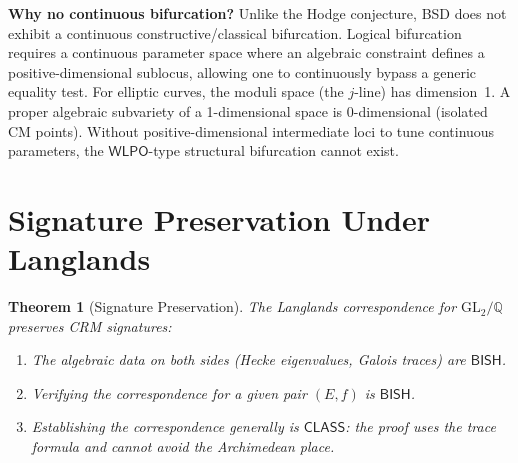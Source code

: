 \documentclass[11pt,a4paper]{article}
\theoremstyle{plain}
\newtheorem{theorem}{Theorem}[section]
\theoremstyle{definition}
\newcommand{\BISH}{\textsf{BISH}}
\newcommand{\WLPO}{\textsf{WLPO}}
\newcommand{\CLASS}{\textsf{CLASS}}
\newcommand{\Q}{\mathbb{Q}}
\newcommand{\GL}{\mathrm{GL}}
\begin{document}
\textbf{Why no continuous bifurcation?} Unlike the Hodge conjecture, BSD does not exhibit a continuous constructive/classical bifurcation. Logical bifurcation requires a continuous parameter space where an algebraic constraint defines a positive-dimensional sublocus, allowing one to continuously bypass a generic equality test. For elliptic curves, the moduli space (the $j$-line) has dimension~1. A proper algebraic subvariety of a 1-dimensional space is 0-dimensional (isolated CM points). Without positive-dimensional intermediate loci to tune continuous parameters, the $\WLPO$-type structural bifurcation cannot exist.


\section{Signature Preservation Under Langlands}\label{sec:langlands}

\begin{theorem}[Signature Preservation]\label{thm:sig-preserve}
The Langlands correspondence for $\GL_2/\Q$ preserves CRM signatures:
\begin{enumerate}[label=(\roman*)]
\item The algebraic data on both sides (Hecke eigenvalues, Galois traces) are $\BISH$.
\item Verifying the correspondence for a given pair $(E, f)$ is $\BISH$.
\item Establishing the correspondence generally is $\CLASS$: the proof uses the trace formula and cannot avoid the Archimedean place.
\end{enumerate}
\end{theorem}
\end{document}
